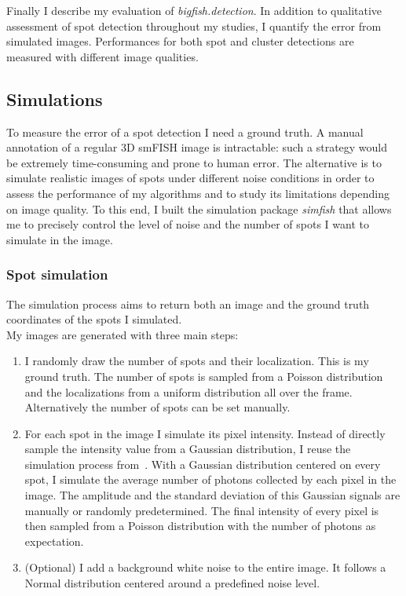 Finally I describe my evaluation of \emph{bigfish.detection}.
In addition to qualitative assessment of spot detection throughout my studies, I quantify the error from simulated images.
Performances for both spot and cluster detections are measured with different image qualities.

\subsection{Simulations}
\label{subsec:simulation}

To measure the error of a spot detection I need a ground truth.
A manual annotation of a regular 3D \ac{smFISH} image is intractable: such a strategy would be extremely time-consuming and prone to human error.
The alternative is to simulate realistic images of spots under different noise conditions in order to assess the performance of my algorithms and to study its limitations depending on image quality.
To this end, I built the simulation package \emph{simfish} that allows me to precisely control the level of noise and the number of spots I want to simulate in the image.

\subsubsection{Spot simulation}

The simulation process aims to return both an image and the ground truth coordinates of the spots I simulated.\\

\noindent
My images are generated with three main steps:
\begin{enumerate}
	\item I randomly draw the number of spots and their localization.
	This is my ground truth.
	The number of spots is sampled from a Poisson distribution and the localizations from a uniform distribution all over the frame.
	Alternatively the number of spots can be set manually.
	\item For each spot in the image I simulate its pixel intensity.
	Instead of directly sample the intensity value from a Gaussian distribution, I reuse the simulation process from~\cite{bahry_rs-fish_2021}.
	With a Gaussian distribution centered on every spot, I simulate the average number of photons collected by each pixel in the image.
	The amplitude and the standard deviation of this Gaussian signals are manually or randomly predetermined.
	The final intensity of every pixel is then sampled from a Poisson distribution with the number of photons as expectation.
	\item (Optional) I add a background white noise to the entire image.
	It follows a Normal distribution centered around a predefined noise level.
\end{enumerate}

